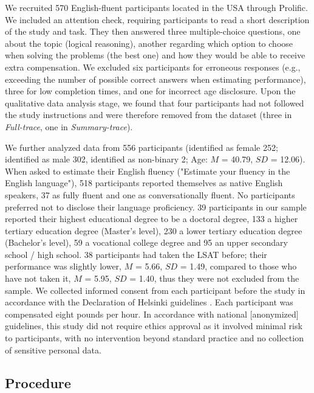 \documentclass[manuscript,review,anonymous]{acmart}
\begin{document}
We recruited 570 English-fluent participants located in the USA through Prolific. We included an attention check, requiring participants to read a short description of the study and task. They then answered three multiple-choice questions, one about the topic (logical reasoning), another regarding which option to choose when solving the problems (the best one) and how they would be able to receive extra compensation.
We excluded six participants for erroneous responses (e.g., exceeding the number of possible correct answers when estimating performance), three for low completion times, and one for incorrect age disclosure. 
Upon the qualitative data analysis stage, we found that four participants had not followed the study instructions and were therefore removed from the dataset (three in \textit{Full-trace}, one in \textit{Summary-trace}).

We further analyzed data from 556 participants (identified as female 252; identified as male 302, identified as non-binary 2; Age: $M$ = 40.79, $SD$ = 12.06). When asked to estimate their English fluency ("Estimate your fluency in the English language"), 518 participants reported themselves as native English speakers, 37 as fully fluent and one as conversationally fluent. No participants preferred not to disclose their language proficiency. 39 participants in our sample reported their highest educational degree to be a doctoral degree, 133 a higher tertiary education degree (Master's level), 230 a lower tertiary education degree (Bachelor's level), 59 a vocational college degree and 95 an upper secondary school / high school. 
38 participants had taken the LSAT before; their performance was slightly lower, $M$ = 5.66, $SD$ = 1.49, compared to those who have not taken it, $M$ = 5.95, $SD$ = 1.40, thus they were not excluded from the sample. We collected informed consent from each participant before the study in accordance with the Declaration of Helsinki guidelines \cite{world2013world}. Each participant was compensated eight pounds per hour. In accordance with national [anonymized] guidelines, %
this study did not require ethics approval as it involved minimal risk to participants, with no intervention beyond standard practice and no collection of sensitive personal data. 


\subsection{Procedure}
\end{document}
